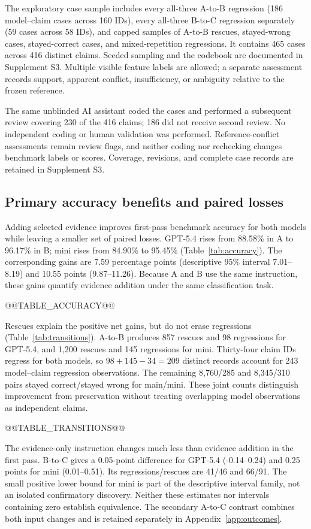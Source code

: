 \documentclass[11pt,letterpaper]{article}
\begin{document}
The exploratory case sample includes every all-three A-to-B regression (186 model--claim cases across 160 IDs), every all-three B-to-C regression separately (59 cases across 58 IDs), and capped samples of A-to-B rescues, stayed-wrong cases, stayed-correct cases, and mixed-repetition regressions. It contains 465 cases across 416 distinct claims. Seeded sampling and the codebook are documented in Supplement S3. Multiple visible feature labels are allowed; a separate assessment records support, apparent conflict, insufficiency, or ambiguity relative to the frozen reference.

The same unblinded AI assistant coded the cases and performed a subsequent review covering 230 of the 416 claims; 186 did not receive second review. No independent coding or human validation was performed. Reference-conflict assessments remain review flags, and neither coding nor rechecking changes benchmark labels or scores. Coverage, revisions, and complete case records are retained in Supplement S3.

\subsection{Primary accuracy benefits and paired losses}\label{sec:primary}
Adding selected evidence improves first-pass benchmark accuracy for both models while leaving a smaller set of paired losses. GPT-5.4 rises from 88.58\% in A to 96.17\% in B; mini rises from 84.90\% to 95.45\% (Table~\ref{tab:accuracy}). The corresponding gains are 7.59 percentage points (descriptive 95\% interval 7.01--8.19) and 10.55 points (9.87--11.26). Because A and B use the same instruction, these gains quantify evidence addition under the same classification task.

@@TABLE_ACCURACY@@

Rescues explain the positive net gains, but do not erase regressions (Table~\ref{tab:transitions}). A-to-B produces 857 rescues and 98 regressions for GPT-5.4, and 1,200 rescues and 145 regressions for mini. Thirty-four claim IDs regress for both models, so $98+145-34=209$ distinct records account for 243 model--claim regression observations. The remaining 8,760/285 and 8,345/310 pairs stayed correct/stayed wrong for main/mini. These joint counts distinguish improvement from preservation without treating overlapping model observations as independent claims.

@@TABLE_TRANSITIONS@@

The evidence-only instruction changes much less than evidence addition in the first pass. B-to-C gives a 0.05-point difference for GPT-5.4 (-0.14--0.24) and 0.25 points for mini (0.01--0.51). Its regressions/rescues are 41/46 and 66/91. The small positive lower bound for mini is part of the descriptive interval family, not an isolated confirmatory discovery. Neither these estimates nor intervals containing zero establish equivalence. The secondary A-to-C contrast combines both input changes and is retained separately in Appendix~\ref{app:outcomes}.
\end{document}
